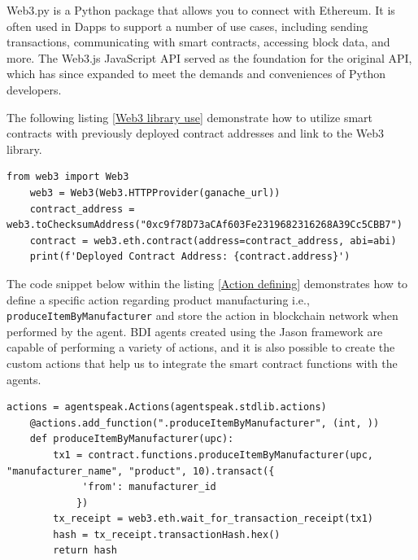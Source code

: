 Web3.py is a Python package that allows you to connect with Ethereum. It is often used in \ac{Dapp}s to support a number of use cases, including sending transactions, communicating with smart contracts, accessing block data, and more. The Web3.js JavaScript \ac{API} served as the foundation for the original \ac{API}, which has since expanded to meet the demands and conveniences of Python developers.

\vspace{.5cm}

The following listing \ref{Web3 library use} demonstrate how to utilize smart contracts with previously deployed contract addresses and link to the Web3 library.

\vspace{.5cm}

\begin{lstlisting}[caption={Web3 library usage},label={Web3 library use},frame=none, numbers=none]
    from web3 import Web3
    web3 = Web3(Web3.HTTPProvider(ganache_url))
    contract_address = web3.toChecksumAddress("0xc9f78D73aCAf603Fe2319682316268A39Cc5CBB7")
    contract = web3.eth.contract(address=contract_address, abi=abi)
    print(f'Deployed Contract Address: {contract.address}')
\end{lstlisting}

\vspace{.5cm}

The code snippet below within the listing \ref{Action defining} demonstrates how to define a specific action regarding product manufacturing i.e., \texttt{produceItemByManufacturer} and store the action in blockchain network when performed by the agent. \ac{BDI} agents created using the Jason framework are capable of performing a variety of actions, and it is also possible to create the custom actions that help us to integrate the smart contract functions with the agents.

\vspace{.5cm}

\begin{lstlisting}[caption={Action defining},label={Action defining}, frame=none, numbers=none]
    actions = agentspeak.Actions(agentspeak.stdlib.actions)
    @actions.add_function(".produceItemByManufacturer", (int, ))
    def produceItemByManufacturer(upc): 
        tx1 = contract.functions.produceItemByManufacturer(upc, "manufacturer_name", "product", 10).transact({
             'from': manufacturer_id
            })
        tx_receipt = web3.eth.wait_for_transaction_receipt(tx1)
        hash = tx_receipt.transactionHash.hex()
        return hash
\end{lstlisting}

